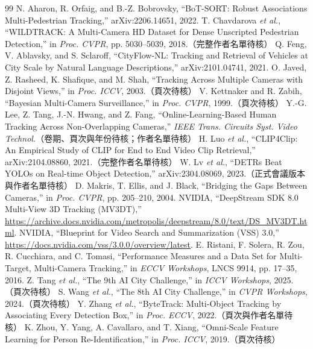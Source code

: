 \documentclass[11pt,a4paper]{article}
\begin{document}
\begin{thebibliography}{99}\small
{} N. Aharon, R. Orfaig, and B.-Z. Bobrovsky, ``BoT-SORT: Robust Associations Multi-Pedestrian Tracking,'' arXiv:2206.14651, 2022.
 T. Chavdarova \emph{et al.}, ``WILDTRACK: A Multi-Camera HD Dataset for Dense Unscripted Pedestrian Detection,'' in \emph{Proc. CVPR}, pp. 5030--5039, 2018.（完整作者名單待核）
 Q. Feng, V. Ablavsky, and S. Sclaroff, ``CityFlow-NL: Tracking and Retrieval of Vehicles at City Scale by Natural Language Descriptions,'' arXiv:2101.04741, 2021.
 O. Javed, Z. Rasheed, K. Shafique, and M. Shah, ``Tracking Across Multiple Cameras with Disjoint Views,'' in \emph{Proc. ICCV}, 2003.（頁次待核）
 V. Kettnaker and R. Zabih, ``Bayesian Multi-Camera Surveillance,'' in \emph{Proc. CVPR}, 1999.（頁次待核）
 Y.-G. Lee, Z. Tang, J.-N. Hwang, and Z. Fang, ``Online-Learning-Based Human Tracking Across Non-Overlapping Cameras,'' \emph{IEEE Trans. Circuits Syst. Video Technol.}（卷期、頁次與年份待核；作者名單待核）
 H. Luo \emph{et al.}, ``CLIP4Clip: An Empirical Study of CLIP for End to End Video Clip Retrieval,'' arXiv:2104.08860, 2021.（完整作者名單待核）
 W. Lv \emph{et al.}, ``DETRs Beat YOLOs on Real-time Object Detection,'' arXiv:2304.08069, 2023.（正式會議版本與作者名單待核）
 D. Makris, T. Ellis, and J. Black, ``Bridging the Gaps Between Cameras,'' in \emph{Proc. CVPR}, pp. 205--210, 2004.
 NVIDIA, ``DeepStream SDK 8.0 Multi-View 3D Tracking (MV3DT),'' \url{https://archive.docs.nvidia.com/metropolis/deepstream/8.0/text/DS_MV3DT.html}.
 NVIDIA, ``Blueprint for Video Search and Summarization (VSS) 3.0,'' \url{https://docs.nvidia.com/vss/3.0.0/overview/latest}.
 E. Ristani, F. Solera, R. Zou, R. Cucchiara, and C. Tomasi, ``Performance Measures and a Data Set for Multi-Target, Multi-Camera Tracking,'' in \emph{ECCV Workshops}, LNCS 9914, pp. 17--35, 2016.
 Z. Tang \emph{et al.}, ``The 9th AI City Challenge,'' in \emph{ICCV Workshops}, 2025.（頁次待核）
 S. Wang \emph{et al.}, ``The 8th AI City Challenge,'' in \emph{CVPR Workshops}, 2024.（頁次待核）
 Y. Zhang \emph{et al.}, ``ByteTrack: Multi-Object Tracking by Associating Every Detection Box,'' in \emph{Proc. ECCV}, 2022.（頁次與作者名單待核）
 K. Zhou, Y. Yang, A. Cavallaro, and T. Xiang, ``Omni-Scale Feature Learning for Person Re-Identification,'' in \emph{Proc. ICCV}, 2019.（頁次待核）
\end{thebibliography}
\end{document}
